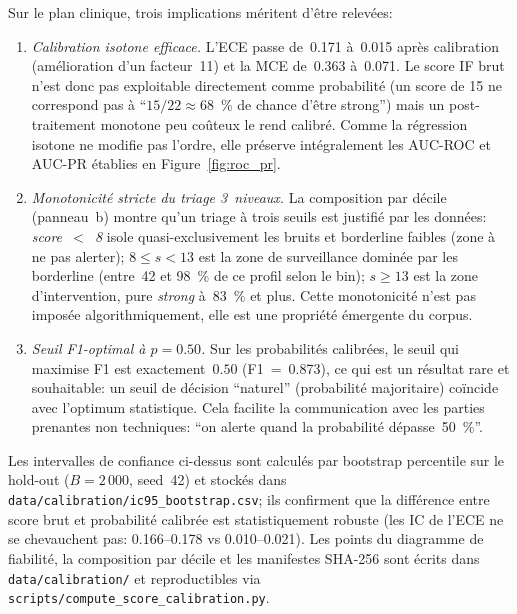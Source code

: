 Sur le plan clinique, trois implications méritent d'être relevées:

\begin{enumerate}
    \item \textit{Calibration isotone efficace.} L'ECE passe de~0.171
    à~0.015 après calibration (amélioration d'un facteur~11) et la MCE
    de~0.363 à~0.071. Le score IF brut n'est donc pas exploitable
    directement comme probabilité (un score de 15 ne correspond pas
    à ``$15/22 \approx 68$~\% de chance d'être strong'') mais un
    post-traitement monotone peu coûteux le rend calibré. Comme la
    régression isotone ne modifie pas l'ordre, elle préserve
    intégralement les AUC-ROC et AUC-PR établies en
    Figure~\ref{fig:roc_pr}.

    \item \textit{Monotonicité stricte du triage 3~niveaux.} La
    composition par décile (panneau~b) montre qu'un triage à trois
    seuils est justifié par les données: \emph{score~$<$~8} isole
    quasi-exclusivement les bruits et borderline faibles
    (zone à ne pas alerter); \emph{$8 \leq s < 13$} est la zone de
    surveillance dominée par les borderline (entre~42 et
    98~\% de ce profil selon le bin); \emph{$s \geq 13$} est la
    zone d'intervention, pure \textit{strong} à~83~\% et plus.
    Cette monotonicité n'est pas imposée algorithmiquement, elle
    est une propriété émergente du corpus.

    \item \textit{Seuil F1-optimal à $p = 0.50$.} Sur les probabilités
    calibrées, le seuil qui maximise F1 est exactement~$0.50$
    (F1~=~0.873), ce qui est un résultat rare et souhaitable: un
    seuil de décision ``naturel'' (probabilité majoritaire) coïncide
    avec l'optimum statistique. Cela facilite la communication avec
    les parties prenantes non techniques: ``on alerte quand la
    probabilité dépasse~50~\%''.
\end{enumerate}

Les intervalles de confiance ci-dessus sont calculés par bootstrap
percentile sur le hold-out ($B = 2\,000$, seed~42) et stockés dans
\texttt{data/calibration/ic95\_bootstrap.csv}; ils confirment que la
différence entre score brut et probabilité calibrée est statistiquement
robuste (les IC de l'ECE ne se chevauchent pas: 0.166--0.178 vs
0.010--0.021). Les points du diagramme de fiabilité, la composition par
décile et les manifestes SHA-256 sont écrits dans
\texttt{data/calibration/} et reproductibles via
\texttt{scripts/compute\_score\_calibration.py}.

